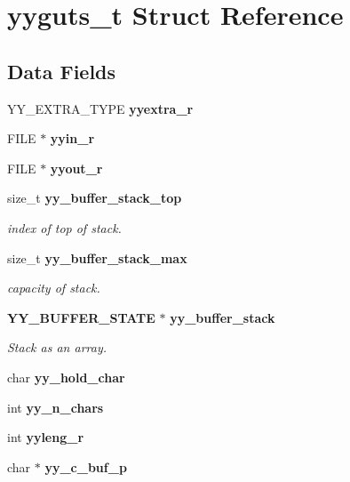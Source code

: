 \section{yyguts\+\_\+t Struct Reference}
\label{structyyguts__t}
\subsection*{Data Fields}
\begin{DoxyCompactItemize}
\item 
\mbox{\label{structyyguts__t_aef05c0d6725a5214f6b30466f0b01c47}} 
Y\+Y\+\_\+\+E\+X\+T\+R\+A\+\_\+\+T\+Y\+PE {\bfseries yyextra\+\_\+r}
\item 
\mbox{\label{structyyguts__t_a21f81ca100b12364a5095a37d1c6f650}} 
F\+I\+LE $\ast$ {\bfseries yyin\+\_\+r}
\item 
\mbox{\label{structyyguts__t_a436368a905aaf12e809e265749c74031}} 
F\+I\+LE $\ast$ {\bfseries yyout\+\_\+r}
\item 
size\+\_\+t \textbf{ yy\+\_\+buffer\+\_\+stack\+\_\+top}
\begin{DoxyCompactList}\small\item\em index of top of stack. \end{DoxyCompactList}\item 
size\+\_\+t \textbf{ yy\+\_\+buffer\+\_\+stack\+\_\+max}
\begin{DoxyCompactList}\small\item\em capacity of stack. \end{DoxyCompactList}\item 
\textbf{ Y\+Y\+\_\+\+B\+U\+F\+F\+E\+R\+\_\+\+S\+T\+A\+TE} $\ast$ \textbf{ yy\+\_\+buffer\+\_\+stack}
\begin{DoxyCompactList}\small\item\em Stack as an array. \end{DoxyCompactList}\item 
\mbox{\label{structyyguts__t_adde3f71374c223bbac47284824996e86}} 
char {\bfseries yy\+\_\+hold\+\_\+char}
\item 
\mbox{\label{structyyguts__t_a99c9218941829a6662d358422fd4184a}} 
int {\bfseries yy\+\_\+n\+\_\+chars}
\item 
\mbox{\label{structyyguts__t_aba739bc731f0e9cbb0b6bdfca7930ebd}} 
int {\bfseries yyleng\+\_\+r}
\item 
\mbox{\label{structyyguts__t_ab1b9bcacb33aab1e02b625512bc0e221}} 
char $\ast$ {\bfseries yy\+\_\+c\+\_\+buf\+\_\+p}
\item 

\end{DoxyCompactItemize}
